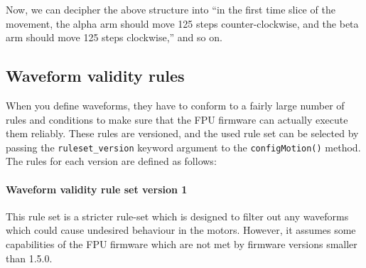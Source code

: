\documentclass[fontsize=12,a4paper]{scrreprt}
\begin{document}
Now, we can decipher the above structure into ``in the first time
slice of the movement, the alpha arm should move 125 steps
counter-clockwise, and the beta arm should move 125 steps
clockwise,'' and so on.

\subsection{Waveform validity rules}
\label{sec:validity_rulesets}

When you define waveforms, they have to conform to a fairly large
number of rules and conditions to make sure that the FPU firmware can
actually execute them reliably. These rules are versioned, and the
used rule set can be selected by passing the \texttt{ruleset\_version}
keyword argument to the \texttt{configMotion()} method.  The rules for
each version are defined as follows:

\paragraph{Waveform validity rule set version 1}

This rule set is a stricter rule-set which is designed to filter out
any waveforms which could cause undesired behaviour in the motors.
However, it assumes some capabilities of the FPU firmware which are
not met by firmware versions smaller than 1.5.0.
\end{document}
